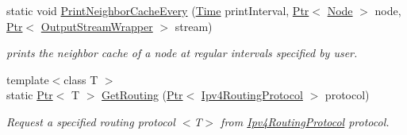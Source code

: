 \begin{DoxyCompactItemize}
static void \hyperlink{classns3_1_1Ipv4RoutingHelper_a8e2a4a699fedde1a4dd18db03c2694b0}{Print\+Neighbor\+Cache\+Every} (\hyperlink{classns3_1_1Time}{Time} print\+Interval, \hyperlink{classns3_1_1Ptr}{Ptr}$<$ \hyperlink{classns3_1_1Node}{Node} $>$ node, \hyperlink{classns3_1_1Ptr}{Ptr}$<$ \hyperlink{classns3_1_1OutputStreamWrapper}{Output\+Stream\+Wrapper} $>$ stream)
\begin{DoxyCompactList}\small\item\em prints the neighbor cache of a node at regular intervals specified by user. \end{DoxyCompactList}\item 
{\footnotesize template$<$class T $>$ }\\static \hyperlink{classns3_1_1Ptr}{Ptr}$<$ T $>$ \hyperlink{classns3_1_1Ipv4RoutingHelper_a97b656bcb2a4e6634698c0686f087159}{Get\+Routing} (\hyperlink{classns3_1_1Ptr}{Ptr}$<$ \hyperlink{classns3_1_1Ipv4RoutingProtocol}{Ipv4\+Routing\+Protocol} $>$ protocol)
\begin{DoxyCompactList}\small\item\em Request a specified routing protocol $<$T$>$ from \hyperlink{classns3_1_1Ipv4RoutingProtocol}{Ipv4\+Routing\+Protocol} protocol. \end{DoxyCompactList}\end{DoxyCompactItemize}
